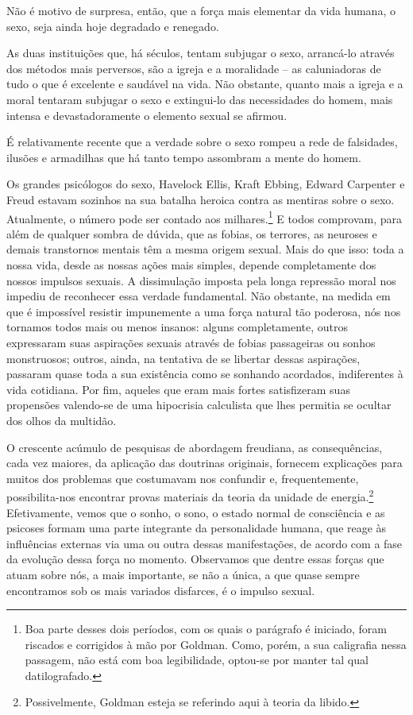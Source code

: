 Não é motivo de surpresa, então, que a força mais elementar da vida
humana, o sexo, seja ainda hoje degradado e renegado.

As duas instituições que, há séculos, tentam subjugar o sexo, arrancá-lo
através dos métodos mais perversos, são a igreja e a moralidade -- as
caluniadoras de tudo o que é excelente e saudável na vida. Não obstante,
quanto mais a igreja e a moral tentaram subjugar o sexo e extingui-lo
das necessidades do homem, mais intensa e devastadoramente o elemento
sexual se afirmou.

É relativamente recente que a verdade sobre o sexo rompeu a rede de
falsidades, ilusões e armadilhas que há tanto tempo assombram a mente do
homem.

Os grandes psicólogos do sexo, Havelock Ellis, Kraft Ebbing, Edward
Carpenter e Freud estavam sozinhos na sua batalha heroica contra as
mentiras sobre o sexo. Atualmente, o número pode ser contado aos
milhares.\footnote{Boa parte desses dois períodos, com os quais o
  parágrafo é iniciado, foram riscados e corrigidos à mão por Goldman.
  Como, porém, a sua caligrafia nessa passagem, não está com boa
  legibilidade, optou-se por manter tal qual datilografado.} E todos
comprovam, para além de qualquer sombra de dúvida, que as fobias, os
terrores, as neuroses e demais transtornos mentais têm a mesma origem
sexual. Mais do que isso: toda a nossa vida, desde as nossas ações mais
simples, depende completamente dos nossos impulsos sexuais. A
dissimulação imposta pela longa repressão moral nos impediu de
reconhecer essa verdade fundamental. Não obstante, na medida em que é
impossível resistir impunemente a uma força natural tão poderosa, nós
nos tornamos todos mais ou menos insanos: alguns completamente, outros
expressaram suas aspirações sexuais através de fobias passageiras ou
sonhos monstruosos; outros, ainda, na tentativa de se libertar dessas
aspirações, passaram quase toda a sua existência como se sonhando
acordados, indiferentes à vida cotidiana. Por fim, aqueles que eram mais
fortes satisfizeram suas propensões valendo-se de uma hipocrisia
calculista que lhes permitia se ocultar dos olhos da multidão.

O crescente acúmulo de pesquisas de abordagem freudiana, as
consequências, cada vez maiores, da aplicação das doutrinas originais,
fornecem explicações para muitos dos problemas que costumavam nos
confundir e, frequentemente, possibilita-nos encontrar provas materiais
da teoria da unidade de energia.\footnote{Possivelmente, Goldman esteja
  se referindo aqui à teoria da libido.} Efetivamente, vemos que o
sonho, o sono, o estado normal de consciência e as psicoses formam uma
parte integrante da personalidade humana, que reage às influências
externas via uma ou outra dessas manifestações, de acordo com a fase da
evolução dessa força no momento. Observamos que dentre essas forças que
atuam sobre nós, a mais importante, se não a única, a que quase sempre
encontramos sob os mais variados disfarces, é o impulso sexual.

